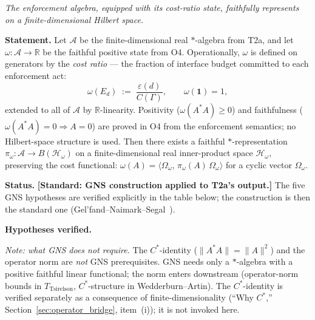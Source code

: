 \documentclass[11pt]{article}
\theoremstyle{remark}
\begin{document}
\begin{tcolorbox}[apfbox, title={Theorem $T_{\mathrm{GNS}}$ (GNS Construction: General Case)}]
\label{thm:T_GNS}
\textit{The enforcement algebra, equipped with its cost-ratio state, faithfully represents on a finite-dimensional Hilbert space.}

\smallskip\noindent\textbf{Statement.}  Let $\mathcal{A}$ be the finite-dimensional real $*$-algebra from T2a, and let $\omega: \mathcal{A} \to \mathbb{R}$ be the faithful positive state from O4.  Operationally, $\omega$ is defined on generators by the \emph{cost ratio} --- the fraction of interface budget committed to each enforcement act:
\[
\omega(E_d) \;:=\; \frac{\varepsilon(d)}{C(\Gamma)}, \qquad \omega(\mathbf{1}) = 1,
\]
extended to all of $\mathcal{A}$ by $\mathbb{R}$-linearity.  Positivity ($\omega(A^*A) \ge 0$) and faithfulness ($\omega(A^*A) = 0 \Rightarrow A = 0$) are proved in O4 from the enforcement semantics; no Hilbert-space structure is used.  Then there exists a faithful $*$-representation $\pi_\omega: \mathcal{A} \to B(\mathcal{H}_\omega)$ on a finite-dimensional real inner-product space $\mathcal{H}_\omega$, preserving the cost functional: $\omega(A) = \langle \Omega_\omega,\, \pi_\omega(A)\, \Omega_\omega \rangle$ for a cyclic vector $\Omega_\omega$.

\smallskip\noindent\textbf{Status.}  \textbf{[Standard: GNS construction applied to T2a's output.]}  The five GNS hypotheses are verified explicitly in the table below; the construction is then the standard one (Gel'fand--Naimark--Segal~\cite{GNS1943}).

\smallskip\noindent\textbf{Hypotheses verified.}

\smallskip\noindent\textit{Note: what GNS does not require.}  The $C^*$-identity ($\|A^*A\| = \|A\|^2$) and the operator norm are \emph{not} GNS prerequisites.  GNS needs only a $*$-algebra with a positive faithful linear functional; the norm enters downstream (operator-norm bounds in $T_{\mathrm{Tsirelson}}$, $C^*$-structure in Wedderburn--Artin).  The $C^*$-identity is verified separately as a consequence of finite-dimensionality (``Why $C^*$,'' Section~\ref{sec:operator_bridge}, item~(i)); it is not invoked here.


\end{tcolorbox}
\end{document}
